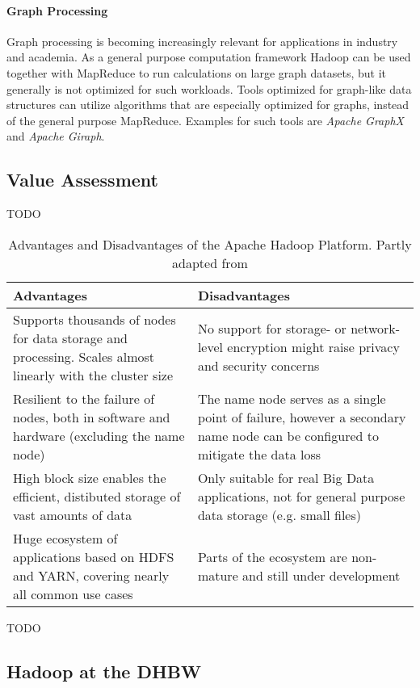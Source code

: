 \paragraph{Graph Processing}
Graph processing is becoming increasingly relevant for
applications in industry and academia. 
As a general purpose computation framework Hadoop 
can be used together with MapReduce to run calculations 
on large graph datasets, 
but it generally is not optimized for such workloads.\autocite[][]{Capota:2015:GBD:2764947.2764954} 
Tools optimized for graph-like data structures can utilize algorithms that are especially optimized for graphs, instead of the general purpose MapReduce.
Examples for such tools are \emph{Apache GraphX} and \emph{Apache Giraph}.

\subsection{Value Assessment}

TODO

\begin{table}[hbt]
    \centering
	\begin{tabular}{p{7cm} p{7cm}}
	  \textbf{Advantages} & \textbf{Disadvantages} \\[0.5em]
	  \hline
	  Supports thousands of nodes for data storage and processing. Scales almost linearly with the cluster size & No support for storage- or network-level encryption might raise privacy and security concerns \\
	  Resilient to the failure of nodes, both in software and hardware (excluding the name node) & The name node serves as a single point of failure, however a secondary name node can be configured to mitigate the data loss\\
	  High block size enables the efficient, distibuted storage of vast amounts of data & Only suitable for real Big Data applications, not for general purpose data storage (e.g. small files) \\
	  Huge ecosystem of applications based on \ac{HDFS} and \ac{YARN}, covering nearly all common use cases & Parts of the ecosystem are non-mature and still under development
	\end{tabular}
	\caption{Advantages and Disadvantages of the Apache Hadoop Platform. Partly adapted from \autocite[][p.~82]{rajasekar2015survey}}
	\label{fig-hadoop-assessment}
\end{table}

TODO

\subsection{Hadoop at the DHBW}

